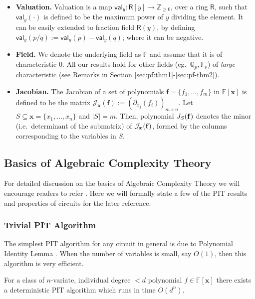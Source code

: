 \documentclass[10pt,a4paper]{article}
\newcommand{\F}{\mathbb{F}}
\newcommand{\Q}{\mathbb{Q}}
\newcommand{\Z}{\mathbb{Z}}
\newcommand{\ringR}{\mathsf{R}}
\newcommand{\x}{{\boldsymbol x}}
\newcommand{\calJ}{\mathcal{J}}
\newcommand{\val}{\mathsf{val}}
\numberwithin{equation}{section}
\begin{document}
\begin{itemize}
    \item \textbf{Valuation.} Valuation is a map $\val_y : \ringR[y] \to \Z_{\ge 0}$, over a ring $\ringR$, such that $\val_y(\cdot)$ is defined to be the maximum power of $y$ dividing the element. It can be easily extended to fraction field $\ringR(y)$, by defining $\val_{y}(p/q):= \val_y(p) - \val_{y}(q)$; where it can be negative.
    
    \item \textbf{Field.} We denote the underlying field as $\F$ and assume that it is of characteristic $0$. All our results hold for other fields (eg.~$\Q_p, \F_p$) of \emph{large} characteristic (see Remarks in Section \ref{sec:pf:thm1}-\ref{sec:pf-thm2}). 
    
    \item \textbf{Jacobian.} The Jacobian of a set of polynomials ${\mathbf f}=\{f_1,\hdots,f_m\}$ in $\F[\x]$ is defined to be the matrix $\calJ_{\x}({\mathbf f}) := \left(\partial_{x_j}(f_i)\right)_{m \times n}$. Let $S \subseteq \x = \{x_1,\hdots,x_n\}$ and $|S|=m$. Then, polynomial $J_{S}({\bf f})$ denotes the minor (i.e.~determinant
    of the submatrix) of $\calJ_{\x}({\bf f})$, formed by the columns corresponding to the variables in $S$.
\end{itemize}

\subsection{Basics of Algebraic Complexity Theory} \label{sec:basic-act}

For detailed discussion on the basics of Algebraic Complexity Theory we will encourage readers to refer \cite{shpilka2010arithmetic,saxena2009progress,Mah13,saxena2014progress,saptharishi2019survey}. Here we will formally state a few of the PIT results and properties of circuits for the later reference.

\subsubsection*{Trivial PIT Algorithm}

The simplest PIT algorithm for any circuit in general is due to Polynomial Identity Lemma \cite{ore1922hohere,DL78,Zip79,schwartz1980fast}. When the number of variables is small, say $O(1)$, then this algorithm is very efficient.

\begin{lemma} \label{lem:trivial-pit}
    For a class of $n$-variate, individual degree $ < d$ polynomial $f \in \F[\x]$ there exists a deterministic PIT algorithm which runs in time $O(d^n)$.
\end{lemma}
\end{document}

